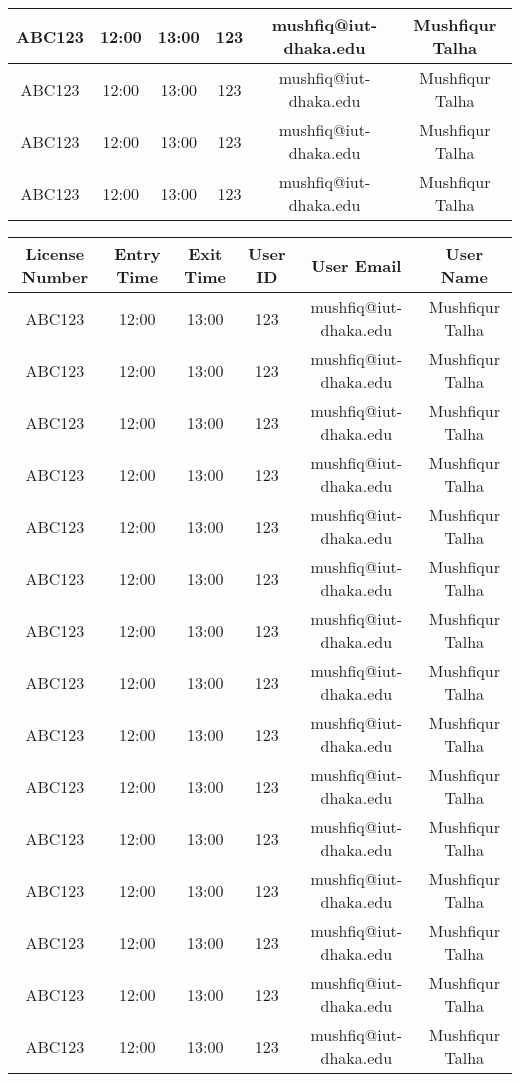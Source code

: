 \documentclass[12pt,notitle]{article}
\begin{document}
\begin{center}
\begin{tabular}{|c|c|c|c|c|c|}
\hline
ABC123 & 12:00 & 13:00 & 123 & mushfiq@iut-dhaka.edu & Mushfiqur Talha \\
\hline
ABC123 & 12:00 & 13:00 & 123 & mushfiq@iut-dhaka.edu & Mushfiqur Talha \\
\hline
ABC123 & 12:00 & 13:00 & 123 & mushfiq@iut-dhaka.edu & Mushfiqur Talha \\
\hline
ABC123 & 12:00 & 13:00 & 123 & mushfiq@iut-dhaka.edu & Mushfiqur Talha \\
\hline
\end{tabular}
\begin{tabular}{|c|c|c|c|c|c|}
\hline
\textbf{License Number} & \textbf{Entry Time} & \textbf{Exit Time} & \textbf{User ID} & \textbf{User Email} & \textbf{User Name} \\
\hline\hline
ABC123 & 12:00 & 13:00 & 123 & mushfiq@iut-dhaka.edu & Mushfiqur Talha \\
\hline
ABC123 & 12:00 & 13:00 & 123 & mushfiq@iut-dhaka.edu & Mushfiqur Talha \\
\hline
ABC123 & 12:00 & 13:00 & 123 & mushfiq@iut-dhaka.edu & Mushfiqur Talha \\
\hline
ABC123 & 12:00 & 13:00 & 123 & mushfiq@iut-dhaka.edu & Mushfiqur Talha \\
\hline
ABC123 & 12:00 & 13:00 & 123 & mushfiq@iut-dhaka.edu & Mushfiqur Talha \\
\hline
ABC123 & 12:00 & 13:00 & 123 & mushfiq@iut-dhaka.edu & Mushfiqur Talha \\
\hline
ABC123 & 12:00 & 13:00 & 123 & mushfiq@iut-dhaka.edu & Mushfiqur Talha \\
\hline
ABC123 & 12:00 & 13:00 & 123 & mushfiq@iut-dhaka.edu & Mushfiqur Talha \\
\hline
ABC123 & 12:00 & 13:00 & 123 & mushfiq@iut-dhaka.edu & Mushfiqur Talha \\
\hline
ABC123 & 12:00 & 13:00 & 123 & mushfiq@iut-dhaka.edu & Mushfiqur Talha \\
\hline
ABC123 & 12:00 & 13:00 & 123 & mushfiq@iut-dhaka.edu & Mushfiqur Talha \\
\hline
ABC123 & 12:00 & 13:00 & 123 & mushfiq@iut-dhaka.edu & Mushfiqur Talha \\
\hline
ABC123 & 12:00 & 13:00 & 123 & mushfiq@iut-dhaka.edu & Mushfiqur Talha \\
\hline
ABC123 & 12:00 & 13:00 & 123 & mushfiq@iut-dhaka.edu & Mushfiqur Talha \\
\hline
ABC123 & 12:00 & 13:00 & 123 & mushfiq@iut-dhaka.edu & Mushfiqur Talha \\

\end{tabular}
\end{center}
\end{document}
